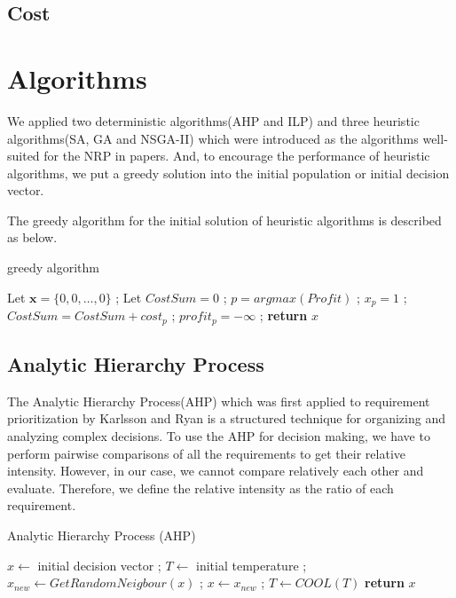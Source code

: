 \subsection{Cost}

\section{Algorithms}
We applied two deterministic algorithms(AHP and ILP) and three heuristic algorithms(SA, GA and NSGA-II) which were introduced as the algorithms well-suited for the NRP in papers\cite{NRP}\cite{ILP}\cite{IGA}\cite{MONRP}. And, to encourage the performance of heuristic algorithms, we put a greedy solution into the initial population or initial decision vector.

The greedy algorithm for the initial solution of heuristic algorithms is described as below. 

\begin{algorithm}
\caption{greedy algorithm}\label{alg:greedy}
\begin{algorithmic}
    \State Let $\textbf{x} = \{0, 0, \ldots, 0\}$ ;
    \State Let $CostSum = 0$ ;
        \State $p = argmax(Profit)$ ;
            \State $x_p = 1$ ;
            \State $CostSum = CostSum + cost_p$ ;
        \EndIf
        \State $profit_p = -\infty$ ;
    \EndFor
    \textbf{return} $x$
\end{algorithmic}
\end{algorithm}


\subsection{Analytic Hierarchy Process}
The Analytic Hierarchy Process(AHP) which was first applied to requirement prioritization by Karlsson and Ryan\cite{AHP} is a structured technique for organizing and analyzing complex decisions. To use the AHP for decision making, we have to perform pairwise comparisons of all the requirements to get their relative intensity. However, in our case, we cannot compare relatively each other and evaluate. Therefore, we define the relative intensity as the ratio of each requirement. 


\begin{algorithm}
\caption{Analytic Hierarchy Process (AHP)}\label{alg:AHP}
\begin{algorithmic}
    \State $x \gets$ initial decision vector ;
    \State $T \gets$ initial temperature ; 
        \State $x_{new} \gets GetRandomNeigbour(x)$ ;
            \State $x \gets x_{new}$ ;
        \EndIf
        \State $T \gets COOL(T)$ 
    \EndWhile
    \textbf{return} $x$
\end{algorithmic}
\end{algorithm}

